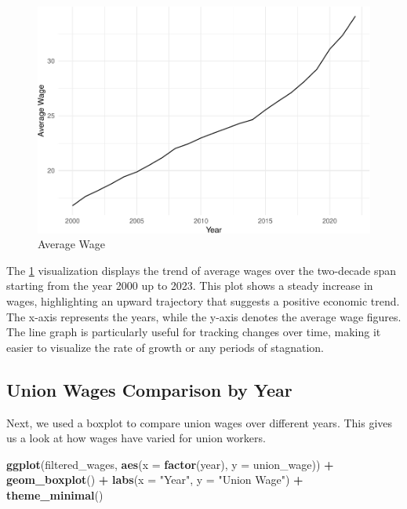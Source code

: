 \documentclass[
]{book}
\newenvironment{Shaded}{\begin{snugshade}}{\end{snugshade}}
\newcommand{\AttributeTok}[1]{\textcolor[rgb]{0.13,0.29,0.53}{#1}}
\newcommand{\FunctionTok}[1]{\textcolor[rgb]{0.13,0.29,0.53}{\textbf{#1}}}
\newcommand{\NormalTok}[1]{#1}
\newcommand{\SpecialCharTok}[1]{\textcolor[rgb]{0.81,0.36,0.00}{\textbf{#1}}}
\newcommand{\StringTok}[1]{\textcolor[rgb]{0.31,0.60,0.02}{#1}}
\theoremstyle{definition}
\theoremstyle{definition}
\theoremstyle{definition}
\theoremstyle{definition}
\theoremstyle{remark}
\begin{document}
\begin{figure}
\centering
\includegraphics{_main_files/figure-latex/averagewage-1.pdf}
\caption{\label{fig:averagewage}Average Wage}
\end{figure}

The \ref{fig:averagewage} visualization displays the trend of average wages over the two-decade span starting from the year 2000 up to 2023. This plot shows a steady increase in wages, highlighting an upward trajectory that suggests a positive economic trend. The x-axis represents the years, while the y-axis denotes the average wage figures. The line graph is particularly useful for tracking changes over time, making it easier to visualize the rate of growth or any periods of stagnation.

\subsection{Union Wages Comparison by Year}\label{union-wages-comparison-by-year}

Next, we used a boxplot to compare union wages over different years. This gives us a look at how wages have varied for union workers.

\begin{Shaded}
\begin{Highlighting}[]
\FunctionTok{ggplot}\NormalTok{(filtered\_wages, }\FunctionTok{aes}\NormalTok{(}\AttributeTok{x =} \FunctionTok{factor}\NormalTok{(year), }\AttributeTok{y =}\NormalTok{ union\_wage)) }\SpecialCharTok{+}
  \FunctionTok{geom\_boxplot}\NormalTok{() }\SpecialCharTok{+}
  \FunctionTok{labs}\NormalTok{(}\AttributeTok{x =} \StringTok{"Year"}\NormalTok{, }\AttributeTok{y =} \StringTok{"Union Wage"}\NormalTok{) }\SpecialCharTok{+}
  \FunctionTok{theme\_minimal}\NormalTok{()}
\end{Highlighting}
\end{Shaded}
\end{document}
